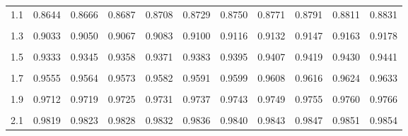 \documentclass[
]{article}
\begin{document}
\begin{longtable}[l]{lcccccccccc}
1.1 & 0.8644 & 0.8666 & 0.8687 & 0.8708 & 0.8729 & 0.8750 & 0.8771 & 0.8791 & 0.8811 & 0.8831\\
\cellcolor{gray!15}{1.2} & \cellcolor{gray!15}{0.8850} & \cellcolor{gray!15}{0.8869} & \cellcolor{gray!15}{0.8889} & \cellcolor{gray!15}{0.8907} & \cellcolor{gray!15}{0.8926} & \cellcolor{gray!15}{0.8944} & \cellcolor{gray!15}{0.8963} & \cellcolor{gray!15}{0.8980} & \cellcolor{gray!15}{0.8998} & \cellcolor{gray!15}{0.9016}\\
1.3 & 0.9033 & 0.9050 & 0.9067 & 0.9083 & 0.9100 & 0.9116 & 0.9132 & 0.9147 & 0.9163 & 0.9178\\
\cellcolor{gray!15}{1.4} & \cellcolor{gray!15}{0.9193} & \cellcolor{gray!15}{0.9208} & \cellcolor{gray!15}{0.9223} & \cellcolor{gray!15}{0.9237} & \cellcolor{gray!15}{0.9251} & \cellcolor{gray!15}{0.9266} & \cellcolor{gray!15}{0.9279} & \cellcolor{gray!15}{0.9293} & \cellcolor{gray!15}{0.9306} & \cellcolor{gray!15}{0.9320}\\
1.5 & 0.9333 & 0.9345 & 0.9358 & 0.9371 & 0.9383 & 0.9395 & 0.9407 & 0.9419 & 0.9430 & 0.9441\\
\cellcolor{gray!15}{1.6} & \cellcolor{gray!15}{0.9453} & \cellcolor{gray!15}{0.9463} & \cellcolor{gray!15}{0.9474} & \cellcolor{gray!15}{0.9485} & \cellcolor{gray!15}{0.9495} & \cellcolor{gray!15}{0.9506} & \cellcolor{gray!15}{0.9516} & \cellcolor{gray!15}{0.9526} & \cellcolor{gray!15}{0.9535} & \cellcolor{gray!15}{0.9545}\\
1.7 & 0.9555 & 0.9564 & 0.9573 & 0.9582 & 0.9591 & 0.9599 & 0.9608 & 0.9616 & 0.9624 & 0.9633\\
\cellcolor{gray!15}{1.8} & \cellcolor{gray!15}{0.9640} & \cellcolor{gray!15}{0.9648} & \cellcolor{gray!15}{0.9656} & \cellcolor{gray!15}{0.9663} & \cellcolor{gray!15}{0.9671} & \cellcolor{gray!15}{0.9678} & \cellcolor{gray!15}{0.9685} & \cellcolor{gray!15}{0.9692} & \cellcolor{gray!15}{0.9699} & \cellcolor{gray!15}{0.9706}\\
1.9 & 0.9712 & 0.9719 & 0.9725 & 0.9731 & 0.9737 & 0.9743 & 0.9749 & 0.9755 & 0.9760 & 0.9766\\
\cellcolor{gray!15}{2} & \cellcolor{gray!15}{0.9771} & \cellcolor{gray!15}{0.9776} & \cellcolor{gray!15}{0.9781} & \cellcolor{gray!15}{0.9787} & \cellcolor{gray!15}{0.9792} & \cellcolor{gray!15}{0.9796} & \cellcolor{gray!15}{0.9801} & \cellcolor{gray!15}{0.9806} & \cellcolor{gray!15}{0.9810} & \cellcolor{gray!15}{0.9815}\\
2.1 & 0.9819 & 0.9823 & 0.9828 & 0.9832 & 0.9836 & 0.9840 & 0.9843 & 0.9847 & 0.9851 & 0.9854\\

\end{longtable}
\end{document}
